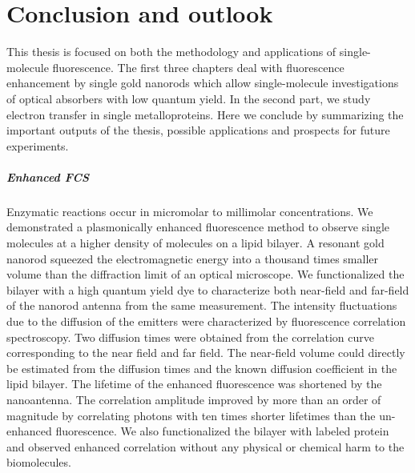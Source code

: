 \chapter*{Conclusion and outlook}
\label{ch:conclusion}

This thesis is focused on both the methodology and applications of single-molecule fluorescence. The first three chapters deal with fluorescence enhancement by single gold nanorods which allow single-molecule investigations of optical absorbers with low quantum yield. In the second part, we study electron transfer in single metalloproteins. Here we conclude by summarizing the important outputs of the thesis, possible applications and prospects for future experiments.


\paragraph*{Enhanced FCS}
Enzymatic reactions occur in micromolar to millimolar concentrations.
We demonstrated a plasmonically enhanced fluorescence method to observe single molecules at a higher density of molecules on a lipid bilayer.
A resonant gold nanorod squeezed the electromagnetic energy into a thousand times smaller volume than the diffraction limit of an optical microscope.
We functionalized the bilayer with a high quantum yield dye to characterize both near-field and far-field of the nanorod antenna from the same measurement.
The intensity fluctuations due to the diffusion of the emitters were characterized by fluorescence correlation spectroscopy.
Two diffusion times were obtained from the correlation curve corresponding to the near field and far field.
The near-field volume could directly be estimated from the diffusion times and the known diffusion coefficient in the lipid bilayer.
The lifetime of the enhanced fluorescence was shortened by the nanoantenna.
The correlation amplitude improved by more than an order of magnitude by correlating photons with ten times shorter lifetimes than the un-enhanced fluorescence.
We also functionalized the bilayer with labeled protein and observed enhanced correlation without any physical or chemical harm to the biomolecules.


